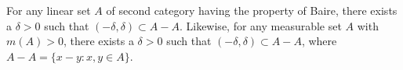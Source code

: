 For any linear set $A$ of second category having the property of Baire, there exists a $\delta > 0$ such that $(-\delta, \delta) \subset A - A$. Likewise, for any measurable set $A$ with $m(A) > 0$, there exists a $\delta > 0$ such that $(-\delta, \delta) \subset A - A$, where $A - A = \{x - y : x, y \in A\}$.
